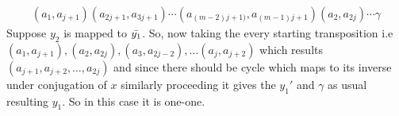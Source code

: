 \documentclass[oneside]{amsart}
\theoremstyle{plain}
\theoremstyle{definition}
\theoremstyle{remark}
\begin{document}
\begin{enumerate}
\begin{enumerate}
                \begin{align*}
                    (a_1, a_{j + 1})(a_{2j + 1}, a_{3j + 1}) \cdots (a_{(m - 2)j + 1)},a_{(m - 1)j + 1})(a_2, a_{2j})\cdots\gamma
                \end{align*}
                Suppose $y_2$ is mapped to $\Bar{y_1}$.
                So, now taking the every starting transposition i.e $(a_1, a_{j + 1}), (a_2, a_{2j}), (a_3, a_{2j - 2}), \ldots (a_j, a_{j + 2})$ which results $(a_{j + 1}, a_{j + 2}, \ldots, a_{2j})$ and since there should be cycle which maps to its inverse under conjugation of $x$ similarly proceeding it gives the $y_1'$ and $\gamma$ as usual resulting $y_1$. So in this case it is one-one.
            \end{enumerate}
        \end{enumerate}


        
\end{document}
